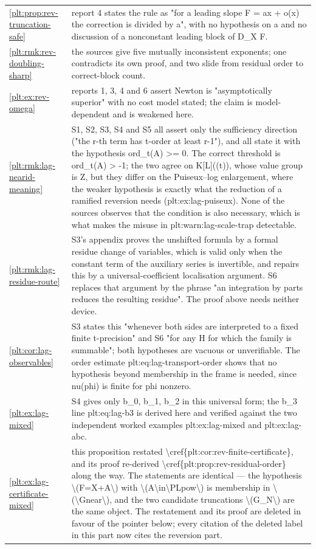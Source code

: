 \documentclass[11pt,oneside]{article}
\theoremstyle{plain}
\theoremstyle{definition}
\theoremstyle{remark}
\begin{document}
\begin{longtable}{@{}p{} p{}@{}}
\cref{plt:prop:rev-truncation-safe} & report 4 states the rule as "for a leading slope F = ax + o(x) the correction is divided by a", with no hypothesis on a and no discussion of a nonconstant leading block of D\_X F.\\
\cref{plt:rmk:rev-doubling-sharp} & the sources give five mutually inconsistent exponents; one contradicts its own proof, and two slide from residual order to correct-block count.\\
\cref{plt:ex:rev-omega} & reports 1, 3, 4 and 6 assert Newton is "asymptotically superior" with no cost model stated; the claim is model-dependent and is weakened here.\\
\cref{plt:rmk:lag-nearid-meaning} & S1, S2, S3, S4 and S5 all assert only the sufficiency direction ("the r-th term has t-order at least r-1"), and all state it with the hypothesis ord\_t(A) >= 0. The correct threshold is ord\_t(A) > -1; the two agree on K[L]((t)), whose value group is Z, but they differ on the Puiseux--log enlargement, where the weaker hypothesis is exactly what the reduction of a ramified reversion needs (plt:ex:lag-puiseux). None of the sources observes that the condition is also necessary, which is what makes the misuse in plt:warn:lag-scale-trap detectable.\\
\cref{plt:rmk:lag-residue-route} & S3's appendix proves the unshifted formula by a formal residue change of variables, which is valid only when the constant term of the auxiliary series is invertible, and repairs this by a universal-coefficient localisation argument. S6 replaces that argument by the phrase "an integration by parts reduces the resulting residue". The proof above needs neither device.\\
\cref{plt:cor:lag-observables} & S3 states this "whenever both sides are interpreted to a fixed finite t-precision" and S6 "for any H for which the family is summable"; both hypotheses are vacuous or unverifiable. The order estimate plt:eq:lag-transport-order shows that no hypothesis beyond membership in the frame is needed, since nu(phi) is finite for phi nonzero.\\
\cref{plt:ex:lag-mixed} & S4 gives only b\_0, b\_1, b\_2 in this universal form; the b\_3 line plt:eq:lag-b3 is derived here and verified against the two independent worked examples plt:ex:lag-mixed and plt:ex:lag-abc.\\
\cref{plt:ex:lag-certificate-mixed} & this proposition restated \textbackslash cref\{plt:cor:rev-finite-certificate\}, and its proof re-derived \textbackslash cref\{plt:prop:rev-residual-order\} along the way. The statements are identical --- the hypothesis \textbackslash (F=X+A\textbackslash ) with \textbackslash (A\textbackslash in\textbackslash PLpow\textbackslash ) is membership in \textbackslash (\textbackslash Gnear\textbackslash ), and the two candidate truncations \textbackslash (G\_N\textbackslash ) are the same object. The restatement and its proof are deleted in favour of the pointer below; every citation of the deleted label in this part now cites the reversion part.\\

\end{longtable}
\end{document}
